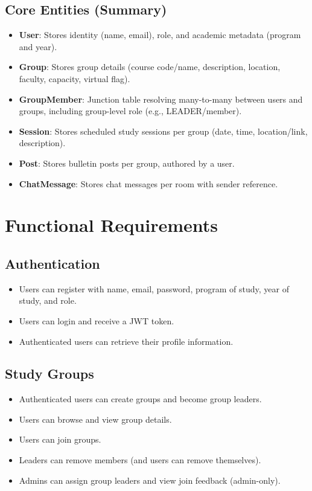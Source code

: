 \documentclass[12pt]{article}
\begin{document}
\subsection{Core Entities (Summary)}
\begin{itemize}
  \item \textbf{User}: Stores identity (name, email), role, and academic metadata (program and year).
  \item \textbf{Group}: Stores group details (course code/name, description, location, faculty, capacity, virtual flag).
  \item \textbf{GroupMember}: Junction table resolving many-to-many between users and groups, including group-level role (e.g., LEADER/member).
  \item \textbf{Session}: Stores scheduled study sessions per group (date, time, location/link, description).
  \item \textbf{Post}: Stores bulletin posts per group, authored by a user.
  \item \textbf{ChatMessage}: Stores chat messages per room with sender reference.
\end{itemize}

\newpage

\section{Functional Requirements}
\subsection{Authentication}
\begin{itemize}
  \item Users can register with name, email, password, program of study, year of study, and role.
  \item Users can login and receive a JWT token.
  \item Authenticated users can retrieve their profile information.
\end{itemize}

\subsection{Study Groups}
\begin{itemize}
  \item Authenticated users can create groups and become group leaders.
  \item Users can browse and view group details.
  \item Users can join groups.
  \item Leaders can remove members (and users can remove themselves).
  \item Admins can assign group leaders and view join feedback (admin-only).
\end{itemize}
\end{document}
